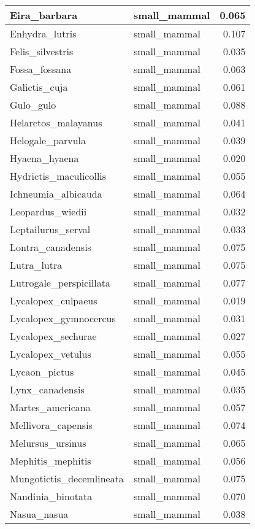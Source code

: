 \begin{table}
\begin{tabular}[t]{l|l|r}
Eira\_barbara & small\_mammal & 0.065\\
\hline
Enhydra\_lutris & small\_mammal & 0.107\\
\hline
Felis\_silvestris & small\_mammal & 0.035\\
\hline
Fossa\_fossana & small\_mammal & 0.063\\
\hline
Galictis\_cuja & small\_mammal & 0.061\\
\hline
Gulo\_gulo & small\_mammal & 0.088\\
\hline
Helarctos\_malayanus & small\_mammal & 0.041\\
\hline
Helogale\_parvula & small\_mammal & 0.039\\
\hline
Hyaena\_hyaena & small\_mammal & 0.020\\
\hline
Hydrictis\_maculicollis & small\_mammal & 0.055\\
\hline
Ichneumia\_albicauda & small\_mammal & 0.064\\
\hline
Leopardus\_wiedii & small\_mammal & 0.032\\
\hline
Leptailurus\_serval & small\_mammal & 0.033\\
\hline
Lontra\_canadensis & small\_mammal & 0.075\\
\hline
Lutra\_lutra & small\_mammal & 0.075\\
\hline
Lutrogale\_perspicillata & small\_mammal & 0.077\\
\hline
Lycalopex\_culpaeus & small\_mammal & 0.019\\
\hline
Lycalopex\_gymnocercus & small\_mammal & 0.031\\
\hline
Lycalopex\_sechurae & small\_mammal & 0.027\\
\hline
Lycalopex\_vetulus & small\_mammal & 0.055\\
\hline
Lycaon\_pictus & small\_mammal & 0.045\\
\hline
Lynx\_canadensis & small\_mammal & 0.035\\
\hline
Martes\_americana & small\_mammal & 0.057\\
\hline
Mellivora\_capensis & small\_mammal & 0.074\\
\hline
Melursus\_ursinus & small\_mammal & 0.065\\
\hline
Mephitis\_mephitis & small\_mammal & 0.056\\
\hline
Mungotictis\_decemlineata & small\_mammal & 0.075\\
\hline
Nandinia\_binotata & small\_mammal & 0.070\\
\hline
Nasua\_nasua & small\_mammal & 0.038\\

\end{tabular}
\end{table}
